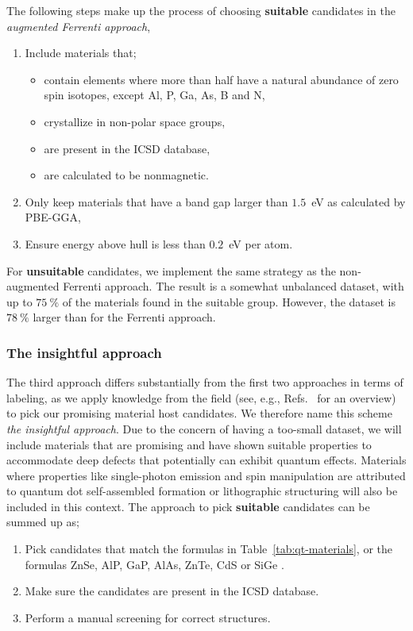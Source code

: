 \documentclass[superscriptaddress,unsortedaddress,
 amsmath,amssymb,
 aps,
]{revtex4-2}
\begin{document}
The following steps make up the process of choosing \textbf{suitable} candidates 
in the \emph{augmented Ferrenti approach},
\begin{enumerate}
    \item Include materials that; 
    \begin{itemize}
        \item contain elements where more than half have a natural abundance of zero spin isotopes, except Al, P, Ga, As, B and N, 
        \item crystallize in non-polar space groups,
        \item are present in the ICSD database,
        \item are calculated to be nonmagnetic. 
    \end{itemize}
    \item Only keep materials that have a band gap larger than $1.5$~eV as calculated by PBE-GGA,
    \item Ensure energy above hull is less than $0.2$~eV per atom. 
\end{enumerate}

For \textbf{unsuitable} candidates, we implement the same strategy as the non-augmented
Ferrenti approach. The result is a somewhat unbalanced dataset, with up to $75 \ \%$ of the 
materials found in the suitable group. However, the dataset is $78 \ \%$ larger than for
the Ferrenti approach.

\subsubsection*{The insightful approach}
The third approach differs substantially from the first two approaches in terms 
of labeling, as we apply knowledge from the field (see, e.g., Refs.~\cite{Atatuere2018,Zhang2020,Son2020,Toth2019,Bathen2021} for an overview)   
to pick our promising material host candidates. We therefore name this scheme 
\emph{the insightful approach}. 
Due to the concern of having a too-small dataset, we will include
materials that are promising and have shown suitable properties to 
accommodate deep defects that potentially can exhibit quantum effects. 
Materials where properties like single-photon emission and spin manipulation are attributed to quantum dot self-assembled formation or lithographic structuring will also be included in this context.  
The approach to pick \textbf{suitable} candidates can be summed up as;   
\begin{enumerate}
    \item Pick candidates that match the formulas in Table~\ref{tab:qt-materials}, or the formulas ZnSe,  AlP, GaP, AlAs, ZnTe, CdS \cite{Weber2010} or SiGe \cite{Hardy2019}. 
    \item Make sure the candidates are present in the ICSD database.  
    \item Perform a manual screening for correct structures.
\end{enumerate}
\end{document}
